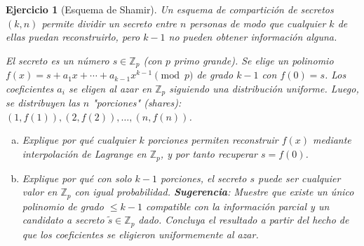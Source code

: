 \documentclass[12pt]{article}
\newtheorem{exercise}{Ejercicio}
\begin{document}
\begin{exercise}[Esquema de Shamir] Un esquema de compartición de secretos $(k, n)$ permite dividir un secreto entre $n$ personas de modo que cualquier $k$ de ellas puedan reconstruirlo, pero $k-1$ no pueden obtener información alguna.

El secreto es un número $s \in \mathbb{Z}_p$ (con $p$ primo grande). Se elige un polinomio $f(x) = s + a_1 x + \cdots + a_{k-1} x^{k-1} \pmod{p}$ de grado $k-1$ con $f(0) = s$. Los coeficientes $a_i$ se eligen al azar en $\mathbb{Z}_p$ siguiendo una distribución uniforme. Luego, se distribuyen las $n$ "porciones" (shares): $(1, f(1)), (2, f(2)), \ldots, (n, f(n))$.
\begin{enumerate}[(a)]
\item Explique por qué cualquier $k$ porciones permiten reconstruir $f(x)$ mediante interpolación de Lagrange en $\mathbb{Z}_p$, y por tanto recuperar $s = f(0)$.
\item Explique por qué con solo $k-1$ porciones, el secreto $s$ puede ser cualquier valor en $\mathbb{Z}_p$ con igual probabilidad.
\textbf{Sugerencia}: Muestre que existe un único polinomio de grado $\le k-1$ compatible con la información parcial y un candidato a secreto $\tilde{s} \in \mathbb{Z}_p$ dado. Concluya el resultado a partir del hecho de que los coeficientes se eligieron uniformemente al azar.
\end{enumerate}
\end{exercise}
\end{document}
